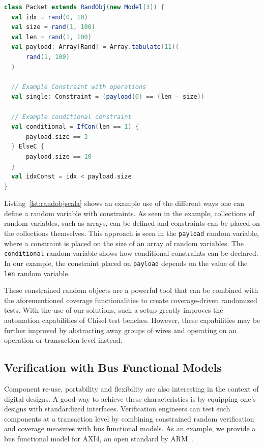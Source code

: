 \documentclass[conference]{IEEEtran}
\begin{document}
\begin{lstlisting}[language=scala, caption={Example usage of a random object. \texttt{rand(min, max, type=Normal)} declares a random variable. Any operation on a random variable generates a constraint.}, label={lst:randobjscala}]    
class Packet extends RandObj(new Model(3)) {
  val idx = rand(0, 10)
  val size = rand(1, 100)
  val len = rand(1, 100)
  val payload: Array[Rand] = Array.tabulate(11)(
 	  rand(1, 100)
  )

  // Example Constraint with operations
  val single: Constraint = (payload(0) == (len - size))

  // Example conditional constraint
  val conditional = IfCon(len == 1) {
      payload.size == 3
  } ElseC {
      payload.size == 10
  }
  val idxConst = idx < payload.size
}
\end{lstlisting}

Listing~\ref{lst:randobjscala} shows an example use of the different ways one can define a random variable with constraints.
As seen in the example, collections of random variables, such as arrays, can be defined and constraints can be placed on the collections themselves.
This approach is seen in the \texttt{payload} random variable, where a constraint is placed on the size of an array of random variables.
The \texttt{conditional} random variable shows how conditional constraints can be declared.
In our example, the constraint placed on \texttt{payload} depends on the value of the \texttt{len} random variable. 

These constrained random objects are a powerful tool that can be combined with the aforementioned coverage functionalities to create coverage-driven randomized tests.
With the use of our solutions, such a setup greatly improves the automation capabilities of Chisel test benches.
However, these capabilities may be further improved by abstracting away groups of wires and operating on an operation or transaction level instead.

\subsection{Verification with Bus Functional Models}
Component re-use, portability and flexibility are also interesting in the context of digital 
designs. A good way to achieve these characteristics is by equipping one's designs with standardized 
interfaces. Verification engineers can test such components at a transaction level by combining constrained random verification 
and coverage measures with bus functional models. As an example, we provide a bus functional model for AXI4, an open standard by 
ARM~\cite{axi4standard}.
\end{document}

